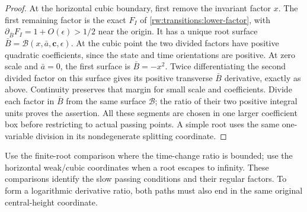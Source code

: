 \begin{proof}
At the horizontal cubic boundary, first remove the invariant factor
$x$. The first remaining factor is the exact $F_I$ of
\eqref{rw:transitions:lower-factor}, with
$\partial_{\bar B}F_I=1+O(\epsilon)>1/2$ near the origin.
It has a unique root surface
$\bar B=\mathcal B(x,\bar a,\mathbf c,\epsilon)$.
At the cubic point the two divided factors have positive quadratic
coefficients, since the state and time orientations are positive.
At zero scale and $\bar a=0$, the first surface is $\bar B=-x^2$.
Twice differentiating the second divided factor on this surface gives
its positive transverse $\bar B$ derivative, exactly as above.
Continuity preserves that margin for small scale and coefficients.
Divide each factor in $\bar B$ from the same surface $\mathcal B$;
the ratio of their two positive integral units proves the assertion.
All these segments are chosen in one larger coefficient box before
restricting to actual passing points. A simple root uses the same
one-variable division in its nondegenerate splitting coordinate.
\end{proof}

Use the finite-root comparison where the time-change ratio is bounded;
use the horizontal weak/cubic coordinates when a root escapes to
infinity. These comparisons identify the slow passing conditions and
their regular factors. To form a logarithmic derivative ratio, both
paths must also end in the same original central-height coordinate.
